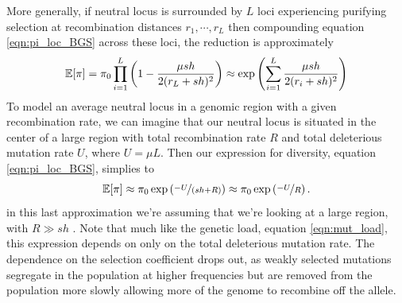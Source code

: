 More generally, if neutral locus is surrounded by $L$ loci
experiencing purifying selection at recombination distances
$r_1,\cdots,r_L$ then compounding equation \eqref{eqn:pi_loc_BGS}
across these loci, the reduction is approximately
\begin{equation}
\mathbb{E}[\pi] = \pi_0  \prod_{i=1}^L \left(1-\frac{\mu sh}{2(r_L+sh)^2}
\right) \approx \exp \left( \sum_{i=1}^L \frac{\mu sh}{2(r_i+sh)^2} \right) \label{eqn:pi_loc_BGS}
\end{equation}
To model an average neutral locus in a genomic region with a given recombination rate, we can imagine that our neutral locus is situated in the center of a large region with
total recombination rate $R$ and total deleterious mutation rate $U$,
where $U = \mu L$. Then our expression for diversity, equation \eqref{eqn:pi_loc_BGS}, simplies to 
\begin{equation}
\mathbb{E}[\pi] \approx \pi_0 \exp \left( \nicefrac{-U}{(sh+R)} \right)
\approx \pi_0 \exp \left( \nicefrac{-U}{R} \right). \label{eqn:GW_BGS_1}
\end{equation}
in this last approximation we're assuming that we're looking at a
large region, with $R \gg sh$ . Note that much like the genetic load,
equation \eqref{eqn:mut_load}, this expression depends on only on the
total deleterious mutation rate. The dependence on the selection
coefficient drops out, as weakly selected mutations segregate in the population at higher
frequencies but are removed from the population more slowly allowing
more of the genome to recombine off the allele. \\
